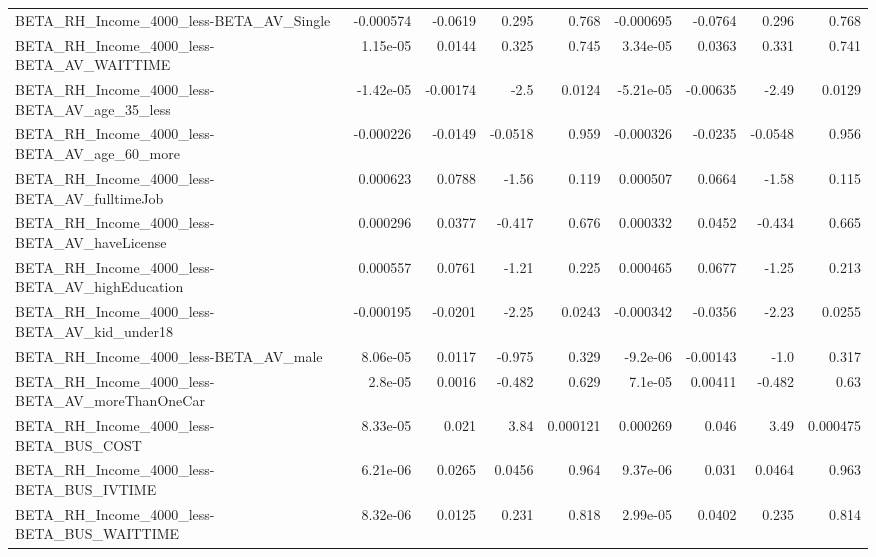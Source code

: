 \begin{tabular}{lrrrrrrrr}
BETA\_RH\_Income\_4000\_less-BETA\_AV\_Single            &   -0.000574 &      -0.0619 &    0.295 &    0.768 &  -0.000695 &     -0.0764 &        0.296 &         0.768 \\
BETA\_RH\_Income\_4000\_less-BETA\_AV\_WAITTIME          &    1.15e-05 &       0.0144 &    0.325 &    0.745 &   3.34e-05 &      0.0363 &        0.331 &         0.741 \\
BETA\_RH\_Income\_4000\_less-BETA\_AV\_age\_35\_less       &   -1.42e-05 &     -0.00174 &     -2.5 &   0.0124 &  -5.21e-05 &    -0.00635 &        -2.49 &        0.0129 \\
BETA\_RH\_Income\_4000\_less-BETA\_AV\_age\_60\_more       &   -0.000226 &      -0.0149 &  -0.0518 &    0.959 &  -0.000326 &     -0.0235 &      -0.0548 &         0.956 \\
BETA\_RH\_Income\_4000\_less-BETA\_AV\_fulltimeJob       &    0.000623 &       0.0788 &    -1.56 &    0.119 &   0.000507 &      0.0664 &        -1.58 &         0.115 \\
BETA\_RH\_Income\_4000\_less-BETA\_AV\_haveLicense       &    0.000296 &       0.0377 &   -0.417 &    0.676 &   0.000332 &      0.0452 &       -0.434 &         0.665 \\
BETA\_RH\_Income\_4000\_less-BETA\_AV\_highEducation     &    0.000557 &       0.0761 &    -1.21 &    0.225 &   0.000465 &      0.0677 &        -1.25 &         0.213 \\
BETA\_RH\_Income\_4000\_less-BETA\_AV\_kid\_under18       &   -0.000195 &      -0.0201 &    -2.25 &   0.0243 &  -0.000342 &     -0.0356 &        -2.23 &        0.0255 \\
BETA\_RH\_Income\_4000\_less-BETA\_AV\_male              &    8.06e-05 &       0.0117 &   -0.975 &    0.329 &   -9.2e-06 &    -0.00143 &         -1.0 &         0.317 \\
BETA\_RH\_Income\_4000\_less-BETA\_AV\_moreThanOneCar    &     2.8e-05 &       0.0016 &   -0.482 &    0.629 &    7.1e-05 &     0.00411 &       -0.482 &          0.63 \\
BETA\_RH\_Income\_4000\_less-BETA\_BUS\_COST             &    8.33e-05 &        0.021 &     3.84 & 0.000121 &   0.000269 &       0.046 &         3.49 &      0.000475 \\
BETA\_RH\_Income\_4000\_less-BETA\_BUS\_IVTIME           &    6.21e-06 &       0.0265 &   0.0456 &    0.964 &   9.37e-06 &       0.031 &       0.0464 &         0.963 \\
BETA\_RH\_Income\_4000\_less-BETA\_BUS\_WAITTIME         &    8.32e-06 &       0.0125 &    0.231 &    0.818 &   2.99e-05 &      0.0402 &        0.235 &         0.814 \\

\end{tabular}
